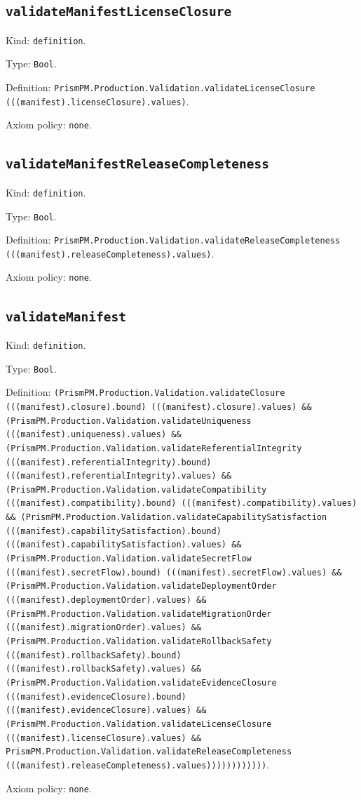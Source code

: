 \documentclass[11pt]{article}
\begin{document}
\subsection*{\texttt{validateManifestLicenseClosure}}
\noindent Kind: \texttt{definition}.\par
\noindent Type: \texttt{Bool}.\par
\noindent Definition: \texttt{PrismPM.Production.Validation.validateLicenseClosure (((manifest).licenseClosure).values)}.\par
\noindent Axiom policy: \texttt{none}.\par
\subsection*{\texttt{validateManifestReleaseCompleteness}}
\noindent Kind: \texttt{definition}.\par
\noindent Type: \texttt{Bool}.\par
\noindent Definition: \texttt{PrismPM.Production.Validation.validateReleaseCompleteness (((manifest).releaseCompleteness).values)}.\par
\noindent Axiom policy: \texttt{none}.\par
\subsection*{\texttt{validateManifest}}
\noindent Kind: \texttt{definition}.\par
\noindent Type: \texttt{Bool}.\par
\noindent Definition: \texttt{(PrismPM.Production.Validation.validateClosure (((manifest).closure).bound) (((manifest).closure).values) \&\& (PrismPM.Production.Validation.validateUniqueness (((manifest).uniqueness).values) \&\& (PrismPM.Production.Validation.validateReferentialIntegrity (((manifest).referentialIntegrity).bound) (((manifest).referentialIntegrity).values) \&\& (PrismPM.Production.Validation.validateCompatibility (((manifest).compatibility).bound) (((manifest).compatibility).values) \&\& (PrismPM.Production.Validation.validateCapabilitySatisfaction (((manifest).capabilitySatisfaction).bound) (((manifest).capabilitySatisfaction).values) \&\& (PrismPM.Production.Validation.validateSecretFlow (((manifest).secretFlow).bound) (((manifest).secretFlow).values) \&\& (PrismPM.Production.Validation.validateDeploymentOrder (((manifest).deploymentOrder).values) \&\& (PrismPM.Production.Validation.validateMigrationOrder (((manifest).migrationOrder).values) \&\& (PrismPM.Production.Validation.validateRollbackSafety (((manifest).rollbackSafety).bound) (((manifest).rollbackSafety).values) \&\& (PrismPM.Production.Validation.validateEvidenceClosure (((manifest).evidenceClosure).bound) (((manifest).evidenceClosure).values) \&\& (PrismPM.Production.Validation.validateLicenseClosure (((manifest).licenseClosure).values) \&\& PrismPM.Production.Validation.validateReleaseCompleteness (((manifest).releaseCompleteness).values))))))))))))}.\par
\noindent Axiom policy: \texttt{none}.\par
\end{document}
